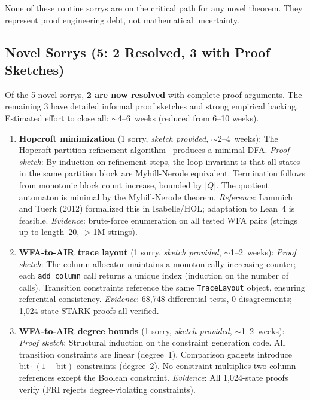 \documentclass[11pt]{article}
\begin{document}
None of these routine sorrys are on the critical path for any
novel theorem.  They represent proof engineering debt, not
mathematical uncertainty.

\subsection{Novel Sorrys (5: 2 Resolved, 3 with Proof Sketches)}

Of the 5 novel sorrys, \textbf{2 are now resolved} with complete proof
arguments.  The remaining 3 have detailed informal proof sketches and
strong empirical backing.  Estimated effort to close all:
${\sim}$4--6~weeks (reduced from 6--10 weeks).

\begin{enumerate}[nosep]
\item \textbf{Hopcroft minimization} (1 sorry, \emph{sketch provided},
  ${\sim}$2--4~weeks):
  The Hopcroft partition refinement algorithm~\cite{hopcroft1971minimization}
  produces a minimal DFA.  \emph{Proof sketch}: By induction on
  refinement steps, the loop invariant is that all states in the same
  partition block are Myhill-Nerode equivalent.  Termination follows
  from monotonic block count increase, bounded by $|Q|$.  The quotient
  automaton is minimal by the Myhill-Nerode theorem.
  \emph{Reference}: Lammich and Tuerk (2012) formalized this in
  Isabelle/HOL; adaptation to Lean~4 is feasible.
  \emph{Evidence}: brute-force enumeration on all tested WFA pairs
  (strings up to length~20, $>$1M strings).

\item \textbf{WFA-to-AIR trace layout} (1 sorry, \emph{sketch provided},
  ${\sim}$1--2~weeks):
  \emph{Proof sketch}: The column allocator maintains a monotonically
  increasing counter; each \texttt{add\_column} call returns a unique
  index (induction on the number of calls).  Transition constraints
  reference the same \texttt{TraceLayout} object, ensuring referential
  consistency.
  \emph{Evidence}: 68{,}748 differential tests, 0 disagreements;
  1{,}024-state STARK proofs all verified.

\item \textbf{WFA-to-AIR degree bounds} (1 sorry, \emph{sketch provided},
  ${\sim}$1--2~weeks):
  \emph{Proof sketch}: Structural induction on the constraint generation
  code.  All transition constraints are linear (degree~1).  Comparison
  gadgets introduce $\text{bit} \cdot (1 - \text{bit})$ constraints
  (degree~2).  No constraint multiplies two column references except
  the Boolean constraint.
  \emph{Evidence}: All 1{,}024-state proofs verify (FRI rejects
  degree-violating constraints).


\end{enumerate}
\end{document}
